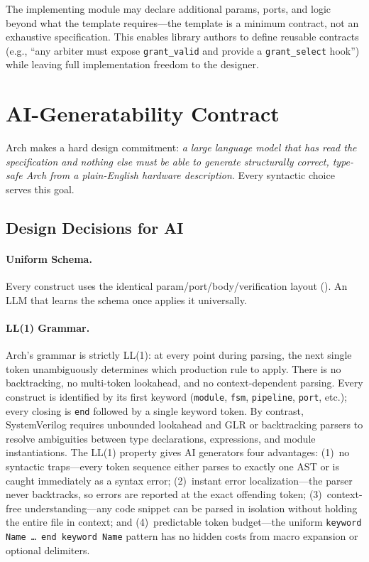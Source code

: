 \documentclass[11pt,twocolumn]{article}
\begin{document}
The implementing module may declare additional params, ports, and logic beyond what the template requires---the template is a minimum contract, not an exhaustive specification. This enables library authors to define reusable contracts (e.g., ``any arbiter must expose \texttt{grant\_valid} and provide a \texttt{grant\_select} hook'') while leaving full implementation freedom to the designer.

\section{AI-Generatability Contract}\label{sec:ai}

Arch makes a hard design commitment: \emph{a large language model that has read the specification and nothing else must be able to generate structurally correct, type-safe Arch from a plain-English hardware description}. Every syntactic choice serves this goal.

\subsection{Design Decisions for AI}

\paragraph{Uniform Schema.} Every construct uses the identical param/port/body/verification layout (). An LLM that learns the schema once applies it universally.

\paragraph{LL(1) Grammar.} Arch's grammar is strictly LL(1): at every point during parsing, the next single token unambiguously determines which production rule to apply. There is no backtracking, no multi-token lookahead, and no context-dependent parsing. Every construct is identified by its first keyword (\texttt{module}, \texttt{fsm}, \texttt{pipeline}, \texttt{port}, etc.); every closing is \texttt{end} followed by a single keyword token. By contrast, SystemVerilog requires unbounded lookahead and GLR or backtracking parsers to resolve ambiguities between type declarations, expressions, and module instantiations. The LL(1) property gives AI generators four advantages: (1)~no syntactic traps---every token sequence either parses to exactly one AST or is caught immediately as a syntax error; (2)~instant error localization---the parser never backtracks, so errors are reported at the exact offending token; (3)~context-free understanding---any code snippet can be parsed in isolation without holding the entire file in context; and (4)~predictable token budget---the uniform \texttt{keyword Name \ldots\ end keyword Name} pattern has no hidden costs from macro expansion or optional delimiters.
\end{document}
